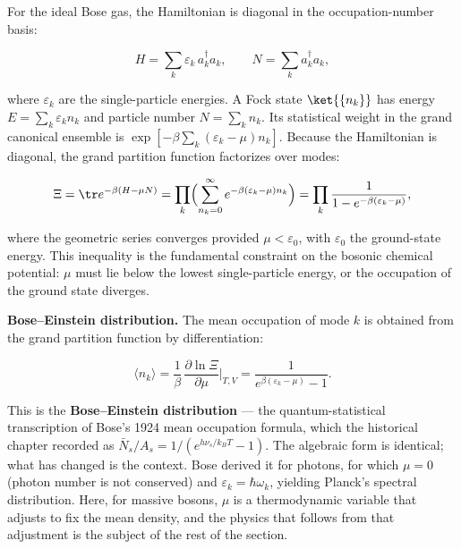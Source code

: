 For the ideal Bose gas, the Hamiltonian is diagonal in the occupation-number basis:
\begin{linenomath}
    \begin{equation*}
        H = \sum_k \varepsilon_k\,a_k^\dagger a_k,
        \qquad
        N = \sum_k a_k^\dagger a_k,
    \end{equation*}
\end{linenomath}
where $\varepsilon_k$ are the single-particle energies. A Fock state $\ket{\{n_k\}}$ has energy $E = \sum_k \varepsilon_k n_k$ and particle number $N = \sum_k n_k$. Its statistical weight in the grand canonical ensemble is $\exp[-\beta\sum_k(\varepsilon_k - \mu)n_k]$. Because the Hamiltonian is diagonal, the grand partition function factorizes over modes:
\begin{linenomath}
    \begin{equation}
        \Xi = \tr e^{-\beta(H - \mu N)}
            = \prod_k \Bigl(\sum_{n_k=0}^{\infty} e^{-\beta(\varepsilon_k - \mu)n_k}\Bigr)
            = \prod_k \frac{1}{1 - e^{-\beta(\varepsilon_k - \mu)}},
        \label{eq:grand-partition-bosons}
    \end{equation}
\end{linenomath}
where the geometric series converges provided $\mu < \varepsilon_0$, with $\varepsilon_0$ the ground-state energy. This inequality is the fundamental constraint on the bosonic chemical potential: $\mu$ must lie below the lowest single-particle energy, or the occupation of the ground state diverges.

\medskip\noindent\textbf{Bose--Einstein distribution.}
The mean occupation of mode $k$ is obtained from the grand partition function by differentiation:
\begin{linenomath}
    \begin{equation}
        \langle n_k \rangle
        = \frac{1}{\beta}\,\frac{\partial \ln\Xi}{\partial\mu}\bigg|_{T,V}
        = \frac{1}{e^{\beta(\varepsilon_k - \mu)} - 1}.
        \label{eq:be-distribution}
    \end{equation}
\end{linenomath}
This is the \textbf{Bose--Einstein distribution} --- the quantum-statistical transcription of Bose's 1924 mean occupation formula, which the historical chapter recorded as $\bar{N}_s/A_s = 1/(e^{h\nu_s/k_B T} - 1)$. The algebraic form is identical; what has changed is the context. Bose derived it for photons, for which $\mu = 0$ (photon number is not conserved) and $\varepsilon_k = \hbar\omega_k$, yielding Planck's spectral distribution. Here, for massive bosons, $\mu$ is a thermodynamic variable that adjusts to fix the mean density, and the physics that follows from that adjustment is the subject of the rest of the section.

